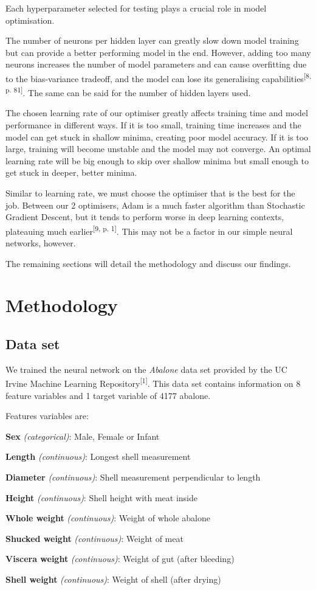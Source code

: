 \documentclass[conference]{IEEEtran}
\begin{document}
Each hyperparameter selected for testing plays a crucial role in model optimisation. 

The number of neurons per hidden layer can greatly slow down model training but can provide a better performing model in the end. However, adding too many neurons increases the number of model parameters and can cause overfitting due to the bias-variance tradeoff, and the model can lose its generalising capabilities\textsuperscript{[8, p. 81]}. The same can be said for the number of hidden layers used.

The chosen learning rate of our optimiser greatly affects training time and model performance in different ways. If it is too small, training time increases and the model can get stuck in shallow minima, creating poor model accuracy. If it is too large, training will become unstable and the model may not converge. An optimal learning rate will be big enough to skip over shallow minima but small enough to get stuck in deeper, better minima.

Similar to learning rate, we must choose the optimiser that is the best for the job. Between our 2 optimisers, Adam is a much faster algorithm than Stochastic Gradient Descent, but it tends to perform worse in deep learning contexts, plateauing much earlier\textsuperscript{[9, p. 1]}. This may not be a factor in our simple neural networks, however.

The remaining sections will detail the methodology and discuss our findings.

\section{Methodology}
\subsection{Data set}
We trained the neural network on the \textit{Abalone} data set provided by the UC Irvine Machine Learning Repository\textsuperscript{[1]}. This data set contains information on 8 feature variables and 1 target variable of 4177 abalone. 

Features variables are:
\begin{description}
    \item \textbf{Sex} \textit{(categorical)}: Male, Female or Infant
    \item \textbf{Length} \textit{(continuous)}: Longest shell measurement
    \item \textbf{Diameter} \textit{(continuous)}: Shell measurement perpendicular to length
    \item \textbf{Height} \textit{(continuous)}: Shell height with meat inside
    \item \textbf{Whole weight} \textit{(continuous)}: Weight of whole abalone
    \item \textbf{Shucked weight} \textit{(continuous)}: Weight of meat
    \item \textbf{Viscera weight} \textit{(continuous)}: Weight of gut (after bleeding) 
    \item \textbf{Shell weight} \textit{(continuous)}: Weight of shell (after drying)
\end{description}
\end{document}
